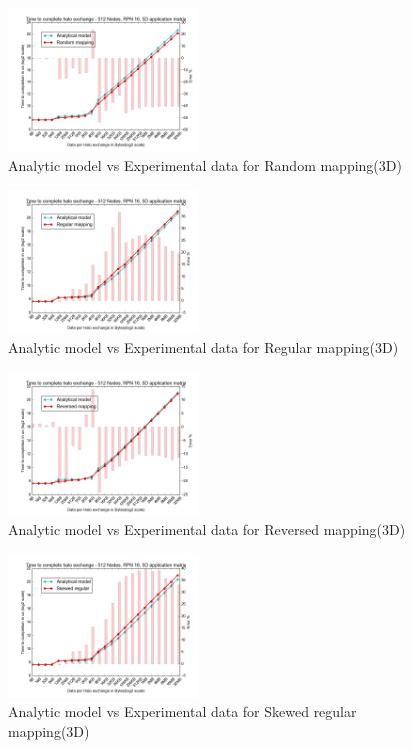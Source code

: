 \documentclass{acm_proc_article-sp}
\begin{document}
\begin{figure}
  \center
  \includegraphics[width=0.45\textwidth]{mappings/3d_random.png}
  \caption{Analytic model vs Experimental data for Random mapping(3D)}
    \label{fig:3D_random_mapping}
\end{figure}

\begin{figure}
  \center
  \includegraphics[width=0.45\textwidth]{mappings/3d_regular.png}
  \caption{Analytic model vs Experimental data for Regular mapping(3D)}
    \label{fig:3D_regular_mapping}
\end{figure}

\begin{figure}
  \center
  \includegraphics[width=0.45\textwidth]{mappings/3d_reversed.png}
  \caption{Analytic model vs Experimental data for Reversed mapping(3D)}
    \label{fig:3D_reversed_mapping}
\end{figure}

\begin{figure}
  \center
  \includegraphics[width=0.45\textwidth]{mappings/3d_skewed_regular.png}
  \caption{Analytic model vs Experimental data for Skewed regular mapping(3D)}
    \label{fig:3D_skewed_regular}
\end{figure}
\end{document}
